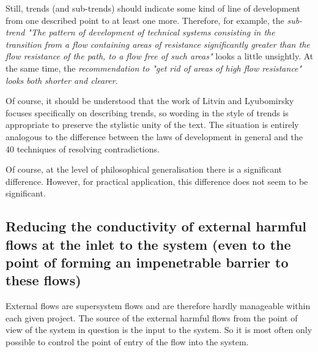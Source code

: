 \documentclass[a4paper,11pt]{article}
\begin{document}
Still, trends (and sub-trends) should indicate some kind of line of
development from one described point to at least one more. Therefore, for
example, the \emph{sub-trend "The pattern of development of technical systems
  consisting in the transition from a flow containing areas of resistance
  significantly greater than the flow resistance of the path, to a flow free
  of such areas"} looks a little unsightly. At the same time, the
\emph{recommendation to "get rid of areas of high flow resistance" looks both
  shorter and clearer}.

Of course, it should be understood that the work of Litvin and Lyubomirsky
focuses specifically on describing trends, so wording in the style of trends
is appropriate to preserve the stylistic unity of the text. The situation is
entirely analogous to the difference between the laws of development in
general and the 40 techniques of resolving contradictions.

Of course, at the level of philosophical generalisation there is a significant
difference. However, for practical application, this difference does not seem
to be significant.

\subsection{Reducing the conductivity of external harmful flows at the inlet
  to the system (even to the point of forming an impenetrable barrier to these
  flows)}

External flows are supersystem flows and are therefore hardly manageable
within each given project. The source of the external harmful flows from the
point of view of the system in question is the input to the system. So it is
most often only possible to control the point of entry of the flow into the
system.
\end{document}
